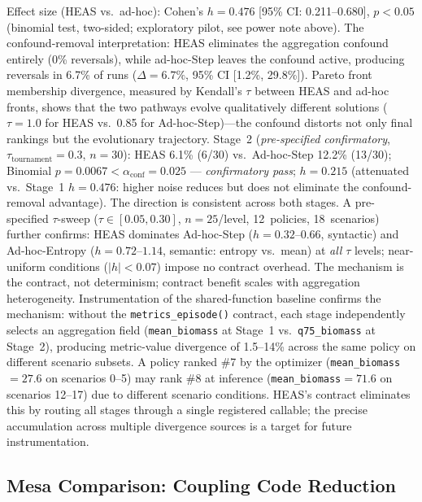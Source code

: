 \documentclass{wscpaperproc}
\begin{document}
Effect size (HEAS vs.\ ad-hoc): Cohen's $h = 0.476$ [95\% CI: 0.211--0.680],
$p < 0.05$ (binomial test, two-sided; exploratory pilot, see power note above).
The confound-removal interpretation: HEAS eliminates the aggregation confound
entirely (0\% reversals), while ad-hoc-Step leaves the confound active, producing
reversals in 6.7\% of runs ($\Delta = 6.7\%$, 95\% CI [1.2\%, 29.8\%]). Pareto
front membership divergence, measured by Kendall's $\tau$ between HEAS and
ad-hoc fronts, shows that the two pathways evolve qualitatively different
solutions ($\tau = 1.0$ for HEAS vs.\ 0.85 for Ad-hoc-Step)---the confound
distorts not only final rankings but the evolutionary trajectory. Stage~2
(\emph{pre-specified confirmatory}, $\tau_\text{tournament}\!=\!0.3$,
$n\!=\!30$): HEAS 6.1\% (6/30) vs.\ Ad-hoc-Step 12.2\% (13/30); Binomial
$p\!=\!0.0067 < \alpha_{\text{conf}}\!=\!0.025$ --- \emph{confirmatory pass};
$h\!=\!0.215$ (attenuated vs.\ Stage~1 $h\!=\!0.476$: higher noise reduces but
does not eliminate the confound-removal advantage). The direction is consistent
across both stages. A pre-specified $\tau$-sweep ($\tau \in [0.05,
0.30]$, $n\!=\!25$/level, 12~policies, 18~scenarios) further confirms: HEAS dominates
Ad-hoc-Step ($h\!=\!0.32$--$0.66$, syntactic) and Ad-hoc-Entropy ($h\!=\!0.72$--$1.14$,
semantic: entropy vs.\ mean) at \emph{all} $\tau$ levels; near-uniform conditions
($|h|\!<\!0.07$) impose no contract overhead. The mechanism is the contract, not
determinism; contract benefit scales with aggregation heterogeneity.
Instrumentation of the shared-function baseline confirms the mechanism:
without the \texttt{metrics\_episode()} contract, each stage independently
selects an aggregation field (\texttt{mean\_biomass} at Stage~1 vs.\
\texttt{q75\_biomass} at Stage~2), producing metric-value divergence of
1.5--14\% across the same policy on different scenario subsets. A policy
ranked \#7 by the optimizer (\texttt{mean\_biomass}$\!=\!27.6$ on
scenarios 0--5) may rank \#8 at inference (\texttt{mean\_biomass}$\!=\!71.6$
on scenarios 12--17) due to different scenario conditions. HEAS's
contract eliminates this by routing all stages through a single registered
callable; the precise accumulation across multiple divergence sources is
a target for future instrumentation.

\subsection{Mesa Comparison: Coupling Code Reduction}
\label{sec:mesa-comparison}
\end{document}
